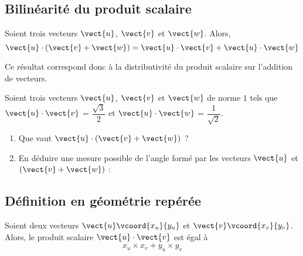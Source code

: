 \documentclass{article}
\begin{document}
\subsection{Bilinéarité du produit scalaire}
\begin{proposition}
Soient trois vecteurs $\vect{u}$, $\vect{v}$ et $\vect{w}$. Alors,
\begin{equation*}
\vect{u} \cdot (\vect{v} + \vect{w}) = \vect{u} \cdot \vect{v} + \vect{u} \cdot \vect{w}
\end{equation*}
\end{proposition}
\begin{remark}
Ce résultat correspond donc à la distributivité du produit scalaire sur l'addition de vecteurs.
\end{remark}
\begin{example}
Soient trois vecteurs $\vect{u}$, $\vect{v}$ et $\vect{w}$ de norme $1$ tels que $\vect{u} \cdot \vect{v}$ = $\dfrac{\sqrt{3}}{2}$  et $\vect{u} \cdot \vect{w}$ = $\dfrac{1}{\sqrt{2}}$.
\begin{enumerate}[label=\emph{\alph*)}]
\item Que vaut $\vect{u} \cdot (\vect{v} + \vect{w})$ ? \answersline
\item En déduire une mesure possible de l'angle formé par les vecteurs $\vect{u}$ et $(\vect{v} + \vect{w})$ : \hfill
\end{enumerate}
\answersline
\end{example}
\subsection{Définition en géométrie repérée}
\begin{proposition}
Soient deux vecteurs $\vect{u}\vcoord{x_u}{y_u}$ et $\vect{v}\vcoord{x_v}{y_v}$. Alors, le produit scalaire $\vect{u} \cdot \vect{v}$ est égal à
\begin{equation*}
x_u \times x_v + y_u \times y_v    
\end{equation*}
\end{proposition}
\end{document}
